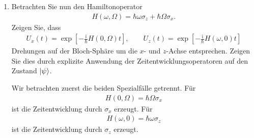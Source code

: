 \documentclass[11pt,a4paper]{scrartcl}
\newcommand{\ii}{\mathrm i}
\begin{document}
\begin{enumerate}[label=(\alph*)]
\begin{calculationbox}
            \begin{solutionbox}[title=Skizze auf der Bloch-Sphäre]
                Die drei Punkte auf der Bloch-Sphäre sind
                \begin{align*}
                    \theta=\frac{\pi}{2},\ \varphi=\frac{\pi}{2}
                    &\quad\Longrightarrow\quad
                    \vec n=(0,1,0),
                    \\[0.3em]
                    \frac{\ket{0}+\ket{1}}{\sqrt2}
                    &\quad\Longrightarrow\quad
                    \vec n=(1,0,0),
                    \\[0.3em]
                    \frac{\ket{0}-\ii\ket{1}}{\sqrt2}
                    &\quad\Longrightarrow\quad
                    \vec n=(0,-1,0).
                \end{align*}
                Für die Skizze zeichnet man die Einheitskugel mit $x$-, $y$- und $z$-Achse. Die drei Zustände liegen alle auf dem Äquator:
                \begin{align*}
                    (1,0,0)\text{ auf }+x,
                    \qquad
                    (0,1,0)\text{ auf }+y,
                    \qquad
                    (0,-1,0)\text{ auf }-y.
                \end{align*}
            \end{solutionbox}
        \end{calculationbox}

        \item Betrachten Sie nun den Hamiltonoperator
        \begin{align*}
            H(\omega,\Omega)
            =
            \hbar\omega\sigma_z+\hbar\Omega\sigma_x.
        \end{align*}
        Zeigen Sie, dass
        \begin{align*}
            U_x(t)=\exp\left[-\frac{\ii}{\hbar}H(0,\Omega)t\right],
            \qquad
            U_z(t)=\exp\left[-\frac{\ii}{\hbar}H(\omega,0)t\right]
        \end{align*}
        Drehungen auf der Bloch-Sphäre um die $x$- und $z$-Achse entsprechen. Zeigen Sie dies durch explizite Anwendung der Zeitentwicklungsoperatoren auf den Zustand $\ket{\psi}$.

        \begin{calculationbox}
            Wir betrachten zuerst die beiden Spezialfälle getrennt. Für
            \begin{align*}
                H(0,\Omega)=\hbar\Omega\sigma_x
            \end{align*}
            ist die Zeitentwicklung durch $\sigma_x$ erzeugt. Für
            \begin{align*}
                H(\omega,0)=\hbar\omega\sigma_z
            \end{align*}
            ist die Zeitentwicklung durch $\sigma_z$ erzeugt.


\end{calculationbox}
\end{enumerate}
\end{document}
